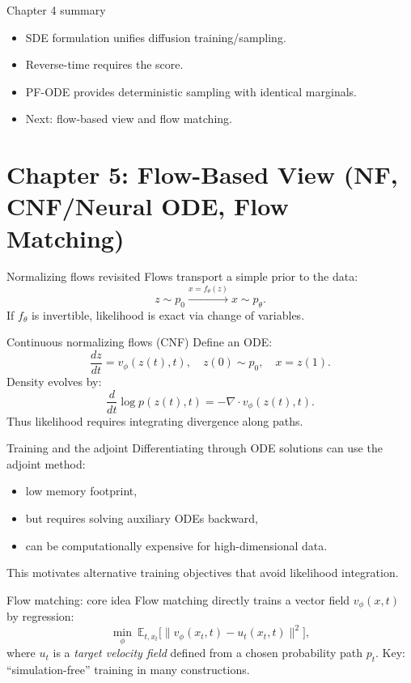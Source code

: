 \documentclass[aspectratio=169]{beamer}
\begin{document}
\begin{frame}{Chapter 4 summary}
\begin{itemize}
\item SDE formulation unifies diffusion training/sampling.
\item Reverse-time requires the score.
\item PF-ODE provides deterministic sampling with identical marginals.
\item Next: flow-based view and flow matching.
\end{itemize}
\end{frame}

\section{Chapter 5: Flow-Based View (NF, CNF/Neural ODE, Flow Matching)}

\begin{frame}{Normalizing flows revisited}
Flows transport a simple prior to the data:
\[
z\sim p_0 \xrightarrow{x=f_\theta(z)} x\sim p_\theta.
\]
If \(f_\theta\) is invertible, likelihood is exact via change of variables.
\end{frame}

\begin{frame}{Continuous normalizing flows (CNF)}
Define an ODE:
\[
\frac{dz}{dt}=v_\phi(z(t),t),\quad z(0)\sim p_0,\quad x=z(1).
\]
Density evolves by:
\[
\frac{d}{dt}\log p(z(t),t) = -\nabla\cdot v_\phi(z(t),t).
\]
Thus likelihood requires integrating divergence along paths.
\end{frame}

\begin{frame}{Training and the adjoint}
Differentiating through ODE solutions can use the adjoint method:
\begin{itemize}
\item low memory footprint,
\item but requires solving auxiliary ODEs backward,
\item can be computationally expensive for high-dimensional data.
\end{itemize}
This motivates alternative training objectives that avoid likelihood integration.
\end{frame}

\begin{frame}{Flow matching: core idea}
Flow matching directly trains a vector field \(v_\phi(x,t)\) by regression:
\[
\min_\phi \ \mathbb{E}_{t,x_t}\big[\|v_\phi(x_t,t)-u_t(x_t,t)\|^2\big],
\]
where \(u_t\) is a \emph{target velocity field} defined from a chosen probability path \(p_t\).
Key: ``simulation-free'' training in many constructions.
\end{frame}
\end{document}
